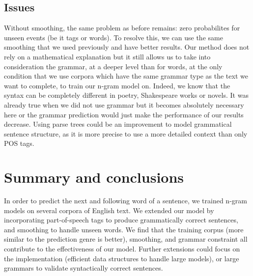 \documentclass[a4paper,12pt]{article}
\begin{document}
\subsection{Issues}

Without smoothing, the same problem as before remains: zero probabilites for unseen events (be it tags or words). To resolve this, we can use the same smoothing that we used previously and have better results. Our method does not rely on a mathematical explanation but it still allows us to take into consideration the grammar, at a deeper level than for words, at the only condition that we use corpora which have the same grammar type as the text we want to complete, to train our n-gram model on. Indeed, we know that the syntax can be completely different in poetry, Shakespeare works or novels. It was already true when we did not use grammar but it becomes absolutely necessary here or the grammar prediction would just make the performance of our results decrease.
Using parse trees could be an improvement to model grammatical sentence structure, as it is more precise to use a more detailed context than only POS tags.

\section{Summary and conclusions}
\label{sec:summary}

In order to predict the next and following word of a sentence, we trained n-gram models on several corpora of English text.  We extended our model by incorporating part-of-speech tags to produce grammatically correct sentences, and smoothing to handle unseen words. 
We find that the training corpus (more similar to the prediction genre is better), smoothing, and grammar constraint all contribute to the effectiveness of our model.  Further extensions could focus on the implementation (efficient data structures to handle large models), or large grammars to validate syntactically correct sentences.

\nocite{*}


\end{document}
